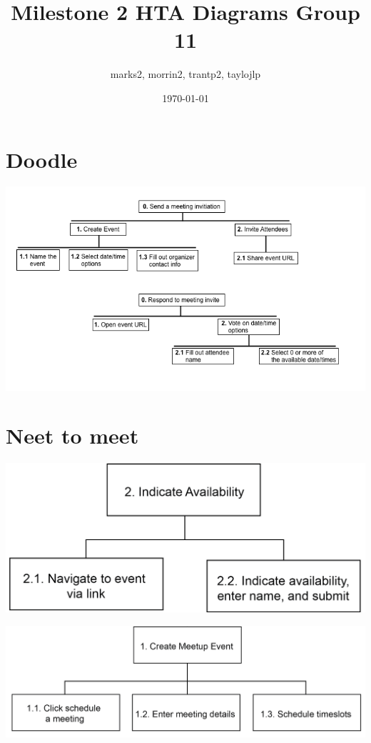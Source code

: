 \documentclass[11pt]{article}
\author{marks2, morrin2, trantp2, taylojlp}
\date{\today}
\title{Milestone 2 HTA Diagrams Group 11}
\begin{document}
\maketitle
\tableofcontents


\section{\textbf{\textbf{Doodle}}}
\label{sec:org50f5fc3}

\begin{center}
\includegraphics[width=.9\linewidth]{doodle/hta.png}
\end{center}

\section{Neet to meet}
\label{sec:org365a02f}

\begin{center}
\includegraphics[width=.9\linewidth]{figures/NeedToMeet/HTA_attend.png}
\end{center}

\begin{center}
\includegraphics[width=.9\linewidth]{figures/NeedToMeet/HTA_host.png}
\end{center}
\end{document}
